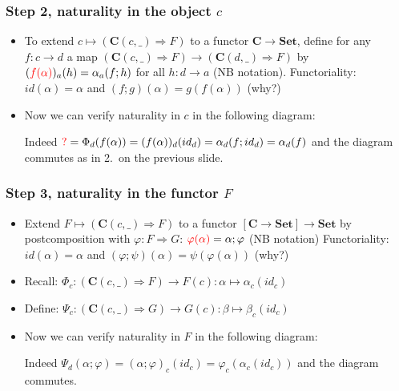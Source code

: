 \documentclass[handout]{beamer}
\newcommand{\To}{\Rightarrow}
\newcommand{\bfsf}[1]{{\boldsymbol{#1}}}
\newcommand{\Set}{\bfsf{Set}}
\newcommand{\CC}{\bfsf{C}}
\begin{document}
\frame
  {   
    \frametitle{Step 2, naturality in the object $c$}\label{Yon:natural_in_c}

 \begin{itemize}[<+->]
\item To extend $c\mapsto(\CC(c,\_)\To F)$ to a functor $\CC\to\Set$, define
for any $f:c\to d$ a map $(\CC(c,\_)\To F)\to(\CC(d,\_)\To F)$ by
$({\color{red}f(\alpha)})_a (h) = \alpha_a(f;h)$ for all $h:d\to a$ (NB {\color{red}notation}).
Functoriality: $id(\alpha) = \alpha$ and $(f;g)(\alpha) = g(f(\alpha))$ (why?)
\item Now we can verify naturality in $c$ in the following diagram:

Indeed ${\color{red} ?}=\Phi_d(f(\alpha)) = (f(\alpha))_d(id_d) = \alpha_d(f;id_d) = \alpha_d(f)$
and the diagram commutes as in 2.\ on the previous slide.
 \end{itemize}

 }

\frame
  {   
    \frametitle{Step 3, naturality in the functor $F$}\label{Yon:natural_in_F}

 \begin{itemize}[<+->]
\item Extend $F\mapsto(\CC(c,\_)\To F)$ to a functor $[\CC\to\Set]\to\Set$
by postcomposition with $\varphi:F\To G$: 
${\color{red}\varphi(\alpha)} = \alpha;\varphi$ (NB {\color{red}notation})
Functoriality: 
$id(\alpha) = \alpha$ and $(\varphi;\psi)(\alpha) = \psi(\varphi(\alpha))$ (why?)
\item Recall: $\Phi_c : (\CC(c,\_)\To F) \to F(c): \alpha\mapsto \alpha_c(id_c)$
\item Define: $\Psi_c : (\CC(c,\_)\To G) \to G(c): \beta\mapsto \beta_c(id_c)$
\item Now we can verify naturality in $F$ in the following diagram:

Indeed $\Psi_d(\alpha;\varphi) = (\alpha;\varphi)_c(id_c) = \varphi_c(\alpha_c(id_c))$
and the diagram commutes.
 \end{itemize}

 }
\end{document}
